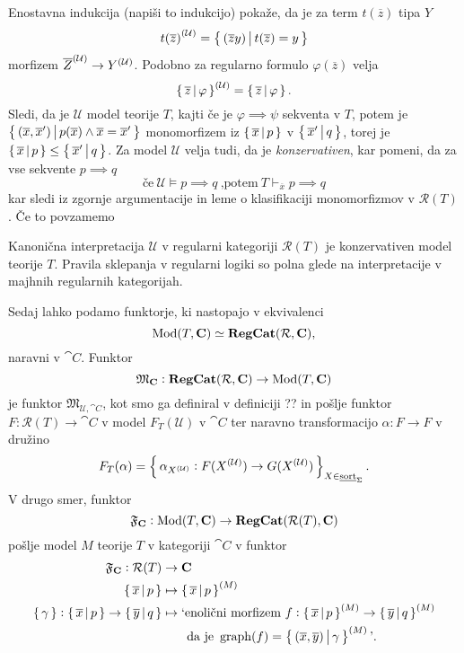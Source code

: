 \documentclass[../kategoricna_logika.tex]{subfiles}
\begin{document}
\noindent
Enostavna indukcija (napiši to indukcijo) pokaže, da je za term $t(\overline{z})$ tipa $Y$
$${t(\overline{z})}^{(\mathcal{U})} = \left\lbrace\,(\overline{z}y)\,\middle|\, t(\overline{z}) = y\,\right\rbrace$$
morfizem ${\overline{Z}}^{(\mathcal{U})} \to {Y}^{(\mathcal{U})}$. Podobno za regularno formulo $\varphi(\overline{z})$ velja 
$${\left\lbrace\,\overline{z}\,\middle|\, \varphi\,\right\rbrace}^{(\mathcal{U})} = \left\lbrace\,\overline{z}\,\middle|\, \varphi\,\right\rbrace.$$
Sledi, da je $\mathcal{U}$ model teorije $T$, kajti če je $\varphi \implies \psi$ sekventa v $T$,
potem je $\left\lbrace\,(\overline{x}, \overline{x}')\,\middle|\, p(\overline{x}) \wedge \overline{x}= \overline{x}'\,\right\rbrace$
monomorfizem iz $\left\lbrace\,\overline{x}\,\middle|\, p\,\right\rbrace$ v $\left\lbrace\,\overline{x}'\,\middle|\, q\,\right\rbrace$,
torej je $\left\lbrace\,\overline{x}\,\middle|\, p\,\right\rbrace \leq \left\lbrace\,\overline{x}'\,\middle|\, q\,\right\rbrace$.
Za model $\mathcal{U}$ velja tudi, da je \emph{konzervativen}, kar pomeni,
da za vse sekvente $p \implies q$
$$\text{če} \ \mathcal{U} \models p \implies q \ \text{,potem} \ T \vdash_{\overline{x}} p \implies q$$
kar sledi iz zgornje argumentacije in leme o klasifikaciji monomorfizmov v $\mathcal{R}(T)$.
Če to povzamemo 
\begin{izrek}
  Kanonična interpretacija $\mathcal{U}$ v regularni kategoriji $\mathcal{R}(T)$ je konzervativen model teorije $T$. Pravila sklepanja v regularni logiki so polna glede na interpretacije v majhnih regularnih kategorijah.
\end{izrek}
Sedaj lahko podamo funktorje, ki nastopajo v ekvivalenci 
$$\operatorname{Mod}(T, {\operatorname{\mathbf{C}}}) \simeq {\operatorname{\mathbf{RegCat}}}(\mathcal{R}, {\operatorname{\mathbf{C}}}),$$
naravni v $\cat{C}$. Funktor 
$$\mathfrak{M}_{{\operatorname{\mathbf{C}}}} : {\operatorname{\mathbf{RegCat}}}(\mathcal{R}, {\operatorname{\mathbf{C}}}) \to \operatorname{Mod}(T, {\operatorname{\mathbf{C}}})$$
je funktor $\mathfrak{M}_{\mathcal{U}, \cat{C}}$, kot smo ga definiral v definiciji ?? in pošlje funktor $F : \mathcal{R}(T) \to \cat{C}$ v model $F_T(\mathcal{U})$ v $\cat{C}$ ter naravno transformacijo $\alpha : F \to F$ v družino
$$F_T(\alpha) = \left\lbrace\,\alpha_{{X}^{(\mathcal{U})}} : F({X}^{(\mathcal{U})}) \to G({X}^{(\mathcal{U})})\,\right\rbrace_{X \in \underline{\mathrm{sort}}_{\Sigma}}.$$
V drugo smer, funktor 
$$\mathfrak{F}_{{\operatorname{\mathbf{C}}}} : \operatorname{Mod}(T, {\operatorname{\mathbf{C}}}) \to {\operatorname{\mathbf{RegCat}}}(\mathcal{R}(T), {\operatorname{\mathbf{C}}})$$
pošlje model $M$ teorije $T$ v kategoriji $\cat{C}$ v funktor
\begin{align*}
  \mathfrak{F}_{{\operatorname{\mathbf{C}}}} : \mathcal{R}(T) &\to {\operatorname{\mathbf{C}}}\\
  \left\lbrace\,\overline{x}\,\middle|\, p\,\right\rbrace &\mapsto \left\lbrace\,\overline{x}\,\middle|\, p\,\right\rbrace^{(M)} \\
  \left\lbrace\,\gamma\,\right\rbrace : \left\lbrace\,\overline{x}\,\middle|\, p\,\right\rbrace \to \left\lbrace\,\overline{y}\,\middle|\, q\,\right\rbrace &\mapsto \text{`enolični morfizem} \ f : \left\lbrace\,\overline{x}\,\middle|\, p\,\right\rbrace^{(M)} \to \left\lbrace\,\overline{y}\,\middle|\, q\,\right\rbrace^{(M)} \\ 
  &\qquad \text{da je} \ \operatorname{graph}(f) = \left\lbrace\,(\overline{x}, \overline{y}) \,\middle|\, \gamma\,\right\rbrace^{(M)} \text{'}.
\end{align*}
\end{document}
